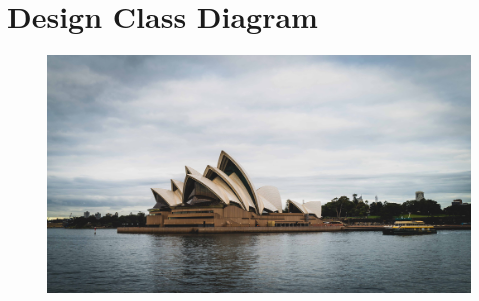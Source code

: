 \section{Design Class Diagram}



\begin{figure}[htbp]
    \center
    \includegraphics[scale=0.07]{img/photo.jpg}
    \caption{}
\end{figure}


